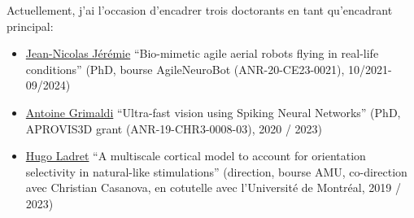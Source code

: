 \documentclass[10pt,french,a4paper,oneside]{article}%
\begin{document}
Actuellement, j'ai l'occasion d'encadrer trois doctorants %
en tant qu'encadrant principal:
\begin{itemize}
	\item \href{https://laurentperrinet.github.io/author/jean-nicolas-jeremie/}{Jean-Nicolas Jérémie} 	``Bio-mimetic agile aerial robots flying in real-life conditions'' (PhD, bourse AgileNeuroBot (ANR-20-CE23-0021), 10/2021-09/2024)
	\item \href{https://laurentperrinet.github.io/author/antoine-grimaldi/}{Antoine Grimaldi} ``Ultra-fast vision using Spiking Neural Networks'' (PhD, APROVIS3D grant (ANR-19-CHR3-0008-03), 2020 / 2023)
	\item \href{https://laurentperrinet.github.io/authors/hugo-ladret/}{Hugo Ladret} ``A multiscale cortical model to account for orientation selectivity in natural-like stimulations''  (direction, bourse AMU, co-direction avec Christian Casanova, en cotutelle avec l'Université de Montréal, 2019 / 2023)
\end{itemize}

\end{document}
